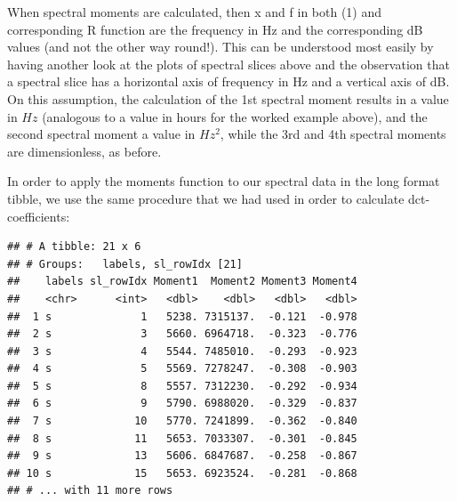 \documentclass[]{book}
\newenvironment{Shaded}{\begin{snugshade}}{\end{snugshade}}
\newcommand{\DataTypeTok}[1]{\textcolor[rgb]{0.13,0.29,0.53}{#1}}
\newcommand{\DecValTok}[1]{\textcolor[rgb]{0.00,0.00,0.81}{#1}}
\newcommand{\KeywordTok}[1]{\textcolor[rgb]{0.13,0.29,0.53}{\textbf{#1}}}
\newcommand{\NormalTok}[1]{#1}
\newcommand{\OperatorTok}[1]{\textcolor[rgb]{0.81,0.36,0.00}{\textbf{#1}}}
\newcommand{\StringTok}[1]{\textcolor[rgb]{0.31,0.60,0.02}{#1}}
\begin{document}
When spectral moments are calculated, then x and f in both (1) and corresponding R function are the frequency in Hz and the corresponding dB values (and not the other way round!). This can be understood most easily by having another look at the plots of spectral slices above and the observation that a spectral slice has a horizontal axis of frequency in Hz and a vertical axis of dB. On this assumption, the calculation of the 1st spectral moment results in a value in \(Hz\) (analogous to a value in hours for the worked example above), and the second spectral moment a value in \(Hz^2\), while the 3rd and 4th spectral moments are dimensionless, as before.

In order to apply the moments function to our spectral data in the long format tibble, we use the same procedure that we had used in order to calculate dct-coefficients:

\begin{Shaded}
\end{Shaded}

\begin{verbatim}
## # A tibble: 21 x 6
## # Groups:   labels, sl_rowIdx [21]
##    labels sl_rowIdx Moment1  Moment2 Moment3 Moment4
##    <chr>      <int>   <dbl>    <dbl>   <dbl>   <dbl>
##  1 s              1   5238. 7315137.  -0.121  -0.978
##  2 s              3   5660. 6964718.  -0.323  -0.776
##  3 s              4   5544. 7485010.  -0.293  -0.923
##  4 s              5   5569. 7278247.  -0.308  -0.903
##  5 s              8   5557. 7312230.  -0.292  -0.934
##  6 s              9   5790. 6988020.  -0.329  -0.837
##  7 s             10   5770. 7241899.  -0.362  -0.840
##  8 s             11   5653. 7033307.  -0.301  -0.845
##  9 s             13   5606. 6847687.  -0.258  -0.867
## 10 s             15   5653. 6923524.  -0.281  -0.868
## # ... with 11 more rows
\end{verbatim}
\end{document}
